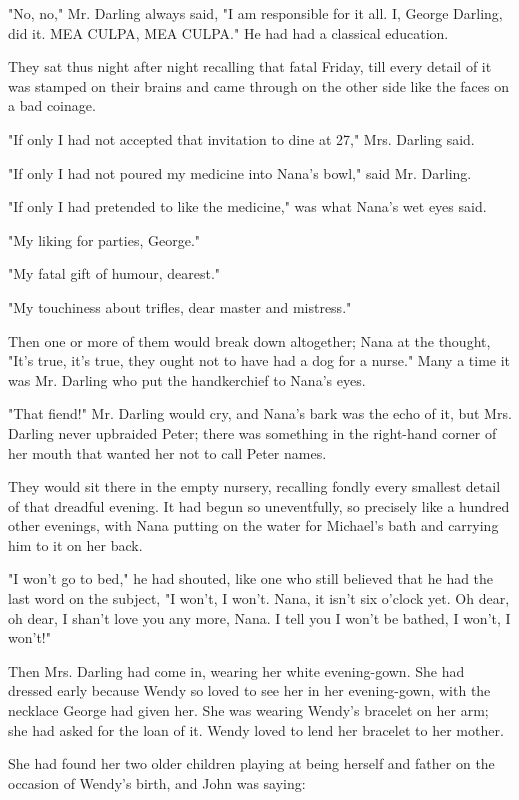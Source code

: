 "No, no," Mr. Darling always said, "I am responsible for it all. I, George
Darling, did it. MEA CULPA, MEA CULPA." He had had a classical education.


They sat thus night after night recalling that fatal Friday, till every
detail of it was stamped on their brains and came through on the other
side like the faces on a bad coinage.


"If only I had not accepted that invitation to dine at 27," Mrs. Darling
said.


"If only I had not poured my medicine into Nana's bowl," said Mr. Darling.


"If only I had pretended to like the medicine," was what Nana's wet eyes
said.


"My liking for parties, George."


"My fatal gift of humour, dearest."


"My touchiness about trifles, dear master and mistress."


Then one or more of them would break down altogether; Nana at the thought,
"It's true, it's true, they ought not to have had a dog for a nurse." Many
a time it was Mr. Darling who put the handkerchief to Nana's eyes.


"That fiend!" Mr. Darling would cry, and Nana's bark was the echo of it,
but Mrs. Darling never upbraided Peter; there was something in the
right-hand corner of her mouth that wanted her not to call Peter names.


They would sit there in the empty nursery, recalling fondly every smallest
detail of that dreadful evening. It had begun so uneventfully, so
precisely like a hundred other evenings, with Nana putting on the water
for Michael's bath and carrying him to it on her back.


"I won't go to bed," he had shouted, like one who still believed that he
had the last word on the subject, "I won't, I won't. Nana, it isn't six
o'clock yet. Oh dear, oh dear, I shan't love you any more, Nana. I tell
you I won't be bathed, I won't, I won't!"


Then Mrs. Darling had come in, wearing her white evening-gown. She had
dressed early because Wendy so loved to see her in her evening-gown, with
the necklace George had given her. She was wearing Wendy's bracelet on her
arm; she had asked for the loan of it. Wendy loved to lend her bracelet to
her mother.


She had found her two older children playing at being herself and father
on the occasion of Wendy's birth, and John was saying:


